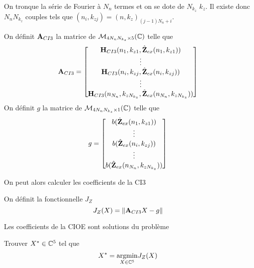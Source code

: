     On tronque la série de Fourier à \(N_{n}\) termes et on se dote de \(N_{k_z}\) \(k_z\). Il existe donc \(N_{n}N_{k_z}\) couples tels que \((n_i,k_{zj}) = (n,k_z)_{(j-1)N_{n}+i}\).
    \begin{defn}
      On définit \(\mathbf{A}_{CI3}\) la matrice de \(\mathcal{M}_{4N_{n}N_{k_z}\times5}(\mathbb C)\) telle que
      \begin{equation*}
        \mathbf{A}_{CI3} = 
        \begin{bmatrix}
          \mathbf{H}_{CI3}(n_1,k_{z1},\hat{\mathbf{Z}}_{ex}(n_1,k_{z1}))
          \\
          \vdots
          \\
          \mathbf{H}_{CI3}(n_i,k_{zj},\hat{\mathbf{Z}}_{ex}(n_i,k_{zj}))
          \\
          \vdots
          \\
          \mathbf{H}_{CI3}(n_{N_n},k_{zN_{k_z}},\hat{\mathbf{Z}}_{ex}(n_{N_n},k_{zN_{k_z}}))
        \end{bmatrix}
      \end{equation*}
      On définit \(g\) la matrice de \(\mathcal{M}_{4N_{n}N_{k_z}\times1}(\mathbb C)\) telle que
      \begin{equation*}
        g = 
        \begin{bmatrix}
          b(\hat{\mathbf{Z}}_{ex}(n_1,k_{z1}))
          \\
          \vdots
          \\
          b(\hat{\mathbf{Z}}_{ex}(n_i,k_{zj}))
          \\
          \vdots
          \\
          b(\hat{\mathbf{Z}}_{ex}(n_{N_n},k_{zN_{k_z}}))
        \end{bmatrix}
      \end{equation*}
    \end{defn}

    On peut alors calculer les coefficients de la CI3
    \begin{defn}
      On définit la fonctionnelle \(J_Z\)
      \begin{equation*}
        J_Z(X) = \left\lVert{\mathbf{A}}_{CI3}X - {g}\right\rVert
      \end{equation*}
    \end{defn}
    \begin{thm}

      Les coefficients de la CIOE sont solutions du problème

      Trouver \(X^* \in \mathbb C^5\) tel que
      \begin{equation*}
        X^* = {\underset{X\in \mathbb C^5}{\operatorname{argmin}}}  J_Z(X)
      \end{equation*}
    \end{thm}

